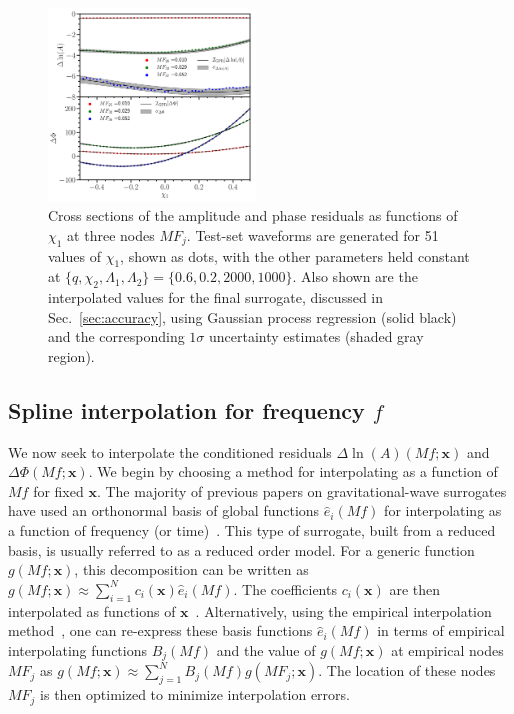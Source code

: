\documentclass[prd,aps,letter,twocolumn,floatfix,notitlepage,nofootinbib]{revtex4-1}
\def\bx{\mathbf{x}}
\begin{document}
\begin{figure}[htb]
\centering
\includegraphics[width=0.49\textwidth]{dhofs.pdf}
\caption{Cross sections of the amplitude and phase residuals as functions of $\chi_1$ at three nodes $MF_j$. Test-set waveforms are generated for 51 values of $\chi_1$, shown as dots, with the other parameters held constant at $\{q, \chi_2, \Lambda_1, \Lambda_2\} = \{0.6, 0.2, 2000, 1000\}$. Also shown are the interpolated values for the final surrogate, discussed in Sec.~\ref{sec:accuracy}, using Gaussian process regression (solid black) and the corresponding $1\sigma$ uncertainty estimates (shaded gray region).}
\label{fig:dhofs}
\end{figure}

\subsection{Spline interpolation for frequency $f$}

We now seek to interpolate the conditioned residuals $\Delta\ln(A)(Mf; \bx)$ and $\Delta\Phi(Mf; \bx)$. We begin by choosing a method for interpolating as a function of $Mf$ for fixed $\bx$. The majority of previous papers on gravitational-wave surrogates have used an orthonormal basis of global functions $\hat e_i(Mf)$ for interpolating as a function of frequency (or time)~\cite{Puerrer2014, Puerrer2015, FieldGalleyHesthaven2014, LackeyBernuzziGalley2017, BlackmanFieldGalley2015, BlackmanFieldScheel2017a, BlackmanFieldScheel2017b}. This type of surrogate, built from a reduced basis, is usually referred to as a reduced order model. For a generic function $g(Mf; \bx)$, this decomposition can be written as $g(Mf; \bx) \approx \sum_{i=1}^N c_i(\bx) \hat e_i(Mf)$. The coefficients $c_i(\bx)$ are then interpolated as functions of $\bx$~\cite{Puerrer2014, Puerrer2015}. Alternatively, using the empirical interpolation method~\cite{Barrault2004, Chaturantabut2010, FieldGalleyHesthaven2014}, one can re-express these basis functions $\hat e_i(Mf)$ in terms of empirical interpolating functions $B_j(Mf)$ and the value of $g(Mf; \bx)$ at empirical nodes $MF_j$ as $g(Mf; \bx) \approx \sum_{j=1}^N B_j(Mf) g(MF_j; \bx)$. The location of these nodes $MF_j$ is then optimized to minimize interpolation errors.
\end{document}
